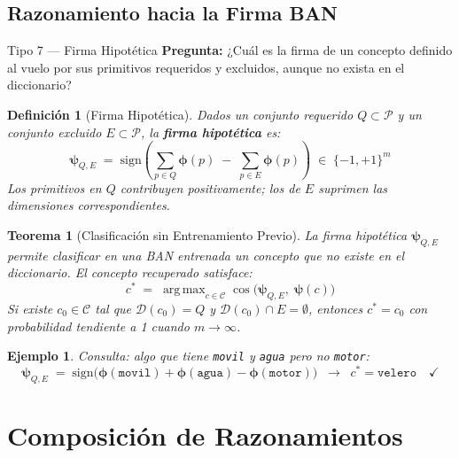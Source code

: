 \documentclass[12pt]{article}
\newtheorem{theorem}{Teorema}[section]
\newtheorem{definition}{Definición}[section]
\newtheorem{example}{Ejemplo}[section]
\begin{document}
\subsection{Razonamiento hacia la Firma BAN}

\begin{razonbox}{Tipo 7 — Firma Hipotética}
	\textbf{Pregunta:} ¿Cuál es la firma de un concepto definido al vuelo por
	sus primitivos requeridos y excluidos, aunque no exista en el diccionario?
\end{razonbox}

\begin{definition}[Firma Hipotética]
	Dados un conjunto requerido $Q \subset \mathcal{P}$ y un conjunto excluido
	$E \subset \mathcal{P}$, la \textbf{firma hipotética} es:
	\[
	\bm{\psi}_{Q,E}
	\;=\; \mathrm{sign}\!\left(
	\sum_{p \in Q} \bm{\phi}(p)
	\;-\;
	\sum_{p \in E} \bm{\phi}(p)
	\right)
	\;\in\; \{-1,+1\}^m
	\]
	Los primitivos en $Q$ contribuyen positivamente; los de $E$ suprimen las
	dimensiones correspondientes.
\end{definition}

\begin{theorem}[Clasificación sin Entrenamiento Previo]
	La firma hipotética $\bm{\psi}_{Q,E}$ permite clasificar en una BAN entrenada
	un concepto que no existe en el diccionario. El concepto recuperado satisface:
	\[
	c^* \;=\; \operatorname{arg\,max}_{c \in \mathcal{C}}
	\cos\!\bigl(\bm{\psi}_{Q,E},\;\bm{\psi}(c)\bigr)
	\]
	Si existe $c_0 \in \mathcal{C}$ tal que $\mathcal{D}(c_0) = Q$ y
	$\mathcal{D}(c_0) \cap E = \emptyset$, entonces $c^* = c_0$ con probabilidad
	tendiente a 1 cuando $m \to \infty$.
\end{theorem}

\begin{example}
	Consulta: algo que tiene \texttt{movil} y \texttt{agua} pero no \texttt{motor}:
	\[
	\bm{\psi}_{Q,E} \;=\;
	\mathrm{sign}\!\bigl(\bm{\phi}(\texttt{movil})
	+ \bm{\phi}(\texttt{agua})
	- \bm{\phi}(\texttt{motor})\bigr)
	\;\;\longrightarrow\;\; c^* = \texttt{velero} \quad\checkmark
	\]
\end{example}

\section{Composición de Razonamientos}
\end{document}
